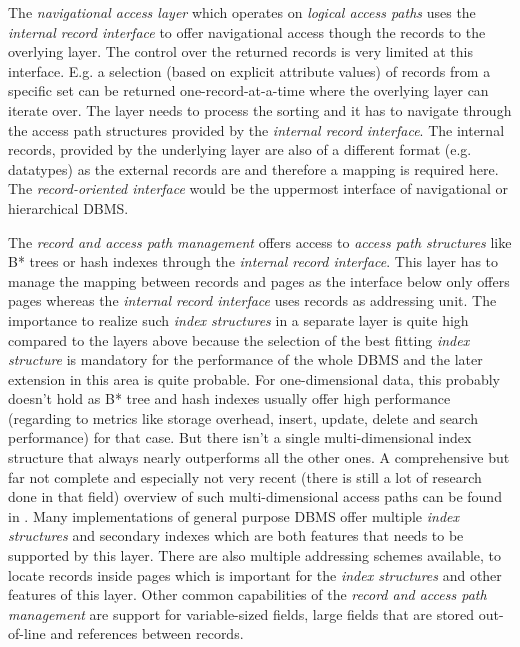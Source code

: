     The \emph{navigational access layer} which operates on \emph{logical access paths} uses the \emph{internal record interface} to offer navigational access though the records to the overlying layer. The control over the returned records is very limited at this interface. E.g. a selection (based on explicit attribute values) of records from a specific set can be returned one-record-at-a-time where the overlying layer can iterate over. The layer needs to process the sorting and it has to navigate through the access path structures provided by the \emph{internal record interface}. The internal records, provided by the underlying layer are also of a different format (e.g. datatypes) as the external records are and therefore a mapping is required here. The \emph{record-oriented interface} would be the uppermost interface of navigational or hierarchical DBMS.

    The \emph{record and access path management} offers access to \emph{access path structures} like B* trees or hash indexes through the \emph{internal record interface}. This layer has to manage the mapping between records and pages as the interface below only offers pages whereas the \emph{internal record interface} uses records as addressing unit. The importance to realize such \emph{index structures} in a separate layer is quite high compared to the layers above because the selection of the best fitting \emph{index structure} is mandatory for the performance of the whole DBMS and the later extension in this area is quite probable. For one-dimensional data, this probably doesn't hold as B* tree and hash indexes usually offer high performance (regarding to metrics like storage overhead, insert, update, delete and search performance) for that case. But there isn't a single multi-dimensional index structure that always nearly outperforms all the other ones. A comprehensive but far not complete and especially not very recent (there is still a lot of research done in that field) overview of such multi-dimensional access paths can be found in \cite{Gaede:1998}. Many implementations of general purpose DBMS offer multiple \emph{index structures} and secondary indexes which are both features that needs to be supported by this layer. There are also multiple addressing schemes available, to locate records inside pages which is important for the \emph{index structures} and other features of this layer. Other common capabilities of the \emph{record and access path management} are support for variable-sized fields, large fields that are stored out-of-line and references between records.

